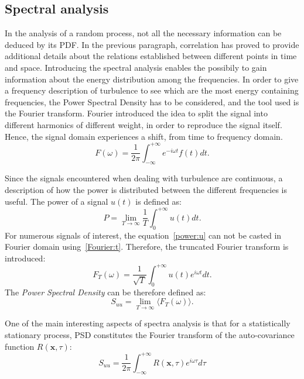 \subsection{Spectral analysis}
In the analysis of a random process, not all the necessary information can be deduced by its PDF. In the previous paragraph, correlation has proved to provide additional details about the relations established between different points in time and space. Introducing the spectral analysis enables the possibily to gain information about the energy distribution among the frequencies. In order to give a frequency description of turbulence to see which are the most energy containing frequencies, the Power Spectral Density has to be considered, and the tool used is the Fourier transform. Fourier introduced the idea to split the signal into different harmonics of different weight, in order to reproduce the signal itself. Hence, the signal domain experiences a shift, from time to frequency domain.
\begin{equation}
F(\omega) = \frac{1}{2\pi} \int_{-\infty}^{+\infty} e^{-i\omega t} f(t) dt.
\label{Fourier:t}
\end{equation}

Since the signals encountered when dealing with turbulence are continuous, a description of how the power is distributed between the different frequencies is useful. The power of a signal $u(t)$ is defined as:
\begin{equation}
P = \lim_{T \to \infty} \frac{1}{T} \int_{0}^{+\infty} u(t) dt.
\label{power:u}
\end{equation}
For numerous signals of interest, the equation~\ref{power:u} can not be casted in Fourier domain using~\ref{Fourier:t}. Therefore, the truncated Fourier transform is introduced:
\begin{equation*}
F_{T}(\omega) = \frac{1}{\sqrt{T}} \int_{0}^{+\infty} u(t) e^{i\omega t} dt.
\end{equation*}
The \emph{Power Spectral Density} can be therefore defined as:
\begin{equation*}
S_{uu} = \lim_{T\to \infty} \langle F_{T}(\omega) \rangle.
\end{equation*}
\par
One of the main interesting aspects of spectra analysis is that for a statistically stationary process, PSD constitutes the Fourier transform of the auto-covariance function $R(\mathbf{x},\tau)$:
\begin{equation*}
S_{uu} = \frac{1}{2\pi} \int_{-\infty}^{+\infty} R(\mathbf{x},\tau) e^{i\omega \tau} d\tau
\end{equation*}

